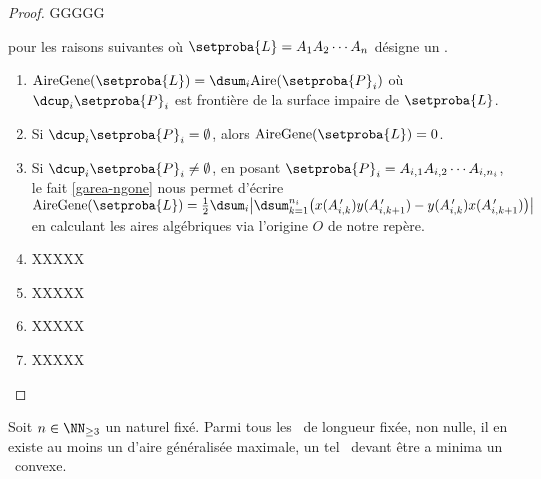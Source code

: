 \begin{proof}
	GGGGG
	
	
	pour les raisons suivantes où $\setproba{L} = A_1 A_2 \cdots A_n$ désigne un \ncycle.
        \begin{enumerate}
        	\item $\garea{\setproba{L}} = \dsum_{i} \area{\setproba{P}_i}$ où $\dcup_{i} \setproba{P}_i$ est frontière de la surface impaire de $\setproba{L}$.


			\item Si $\dcup_{i} \setproba{P}_i = \emptyset$, alors $\garea{\setproba{L}} = 0$.


			\item Si $\dcup_{i} \setproba{P}_i \neq \emptyset$, 
			en posant $\setproba{P}_i = A_{i,1} A_{i,2} \cdots A_{i,n_i}$, 
			le fait \ref{garea-ngone} nous permet d'écrire
			$ \garea{\setproba{L}} 
			= \frac12 \dsum_{i} \big\lvert
				\dsum_{k=1}^{n_i} \big( 
					  x(A^{\,\prime}_{i,k}) y(A^{\,\prime}_{i,k+1}) 
					- y(A^{\,\prime}_{i,k}) x(A^{\,\prime}_{i,k+1})
				\big)
			 \big\rvert$
			en calculant les aires algébriques via l'origine $O$ de notre repère.

			\item XXXXX

			\item XXXXX

			\item XXXXX

			\item XXXXX
        \end{enumerate}

\end{proof}




\begin{fact} \label{suff-cond-ncycle}
    Soit $n \in \NN_{\geq3}$ un naturel fixé.
    Parmi tous les \ncycles\ de longueur fixée, non nulle, il en existe au moins un d'aire généralisée maximale, un tel \ncycle\ devant être a minima un \ngone\ convexe.
\end{fact}


